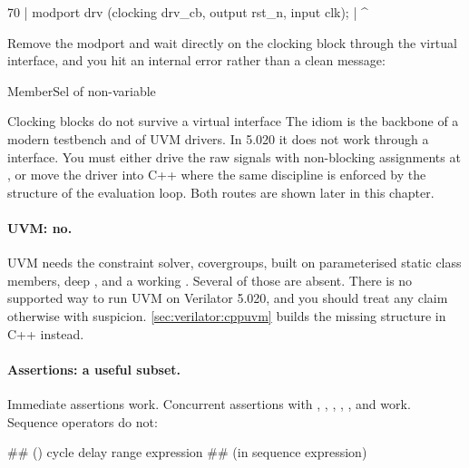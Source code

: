 \begin{txtcode}
   70 |   modport drv (clocking drv_cb, output rst_n, input clk);
      |                ^~~~~~~~
\end{txtcode}

Remove the modport and wait directly on the clocking block through the virtual
interface, and you hit an internal error rather than a clean message:

\begin{txtcode}
        MemberSel of non-variable
\end{txtcode}

\begin{gotcha}{Clocking blocks do not survive a virtual interface}
The idiom  is the backbone of a
modern \SV{} testbench and of UVM drivers. In 5.020 it does not work through a
 interface. You must either drive the raw signals with non-blocking
assignments at , or move the driver into C++ where the
same discipline is enforced by the structure of the evaluation loop. Both
routes are shown later in this chapter.
\end{gotcha}

\paragraph{UVM: no.} UVM needs the constraint solver, covergroups,
 built on parameterised static class members, deep
, and a working . Several of those are absent.
There is no supported way to run UVM on Verilator 5.020, and you should treat
any claim otherwise with suspicion. \cref{sec:verilator:cppuvm} builds the
missing structure in C++ instead.

\paragraph{Assertions: a useful subset.} Immediate assertions work.
Concurrent assertions with \code{|->}, \code{|=>}, ,
, ,  and  work. Sequence
operators do not:

\begin{txtcode}
        ## () cycle delay range expression
        ## (in sequence expression)
\end{txtcode}

